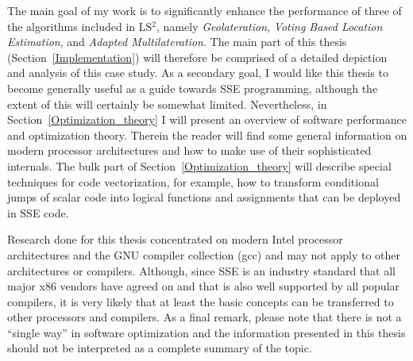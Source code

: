 The main goal of my work is to significantly enhance the performance of three of the algorithms included in LS$^{2}$, namely \emph{Geolateration}, \emph{Voting Based Location Estimation}, and \emph{Adapted Multilateration}. The main part of this thesis (Section~\ref{Implementation}) will therefore be comprised of a detailed depiction and analysis of this case study. As a secondary goal, I would like this thesis to become generally useful as a guide towards SSE programming, although the extent of this will certainly be somewhat limited. Nevertheless, in Section~\ref{Optimization_theory} I will present an overview of software performance and optimization theory. Therein the reader will find some general information on modern processor architectures and how to make use of their sophisticated internals. The bulk part of Section~\ref{Optimization_theory} will describe special techniques for code vectorization, for example, how to transform conditional jumps of scalar code into logical functions and assignments that can be deployed in SSE code.

Research done for this thesis concentrated on modern Intel processor architectures and the GNU compiler collection (gcc) and may not apply to other architectures or compilers. Although, since SSE is an industry standard that all major x86 vendors have agreed on and that is also well supported by all popular compilers, it is very likely that at least the basic concepts can be transferred to other processors and compilers. As a final remark, please note that there is not a ``single way'' in software optimization and the information presented in this thesis should not be interpreted as a complete summary of the topic.
